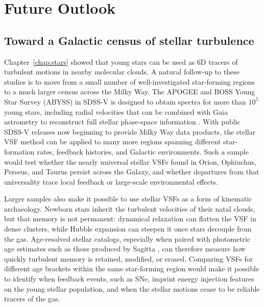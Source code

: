\section{Future Outlook}

\subsection{Toward a Galactic census of stellar turbulence}

Chapter~\ref{chap:stars} showed that young stars can be used as 6D tracers of turbulent motions in nearby molecular clouds.
A natural follow-up to these studies is to move from a small number of well-investigated star-forming regions to a much larger census across the Milky Way.
The APOGEE and BOSS Young Star Survey (ABYSS) in SDSS-V is designed to obtain spectra for more than $10^5$ young stars, including radial velocities that can be combined with Gaia astrometry to reconstruct full stellar phase-space information \citep{kounkel_abyss_2023}.
With public SDSS-V releases now beginning to provide Milky Way data products, the stellar VSF method can be applied to many more regions spanning different star-formation rates, feedback histories, and Galactic environments.
Such a sample would test whether the nearly universal stellar VSFs found in Orion, Ophiuchus, Perseus, and Taurus \citep{ha_turbulence_2022} persist across the Galaxy, and whether departures from that universality trace local feedback or large-scale environmental effects.

Larger samples also make it possible to use stellar VSFs as a form of kinematic archaeology.
Newborn stars inherit the turbulent velocities of their natal clouds, but that memory is not permanent: dynamical relaxation can flatten the VSF in dense clusters, while Hubble expansion can steepen it once stars decouple from the gas.
Age-resolved stellar catalogs, especially when paired with photometric age estimates such as those produced by Sagitta \citep{mcbride_untangling_2021}, can therefore measure how quickly turbulent memory is retained, modified, or erased.
Comparing VSFs for different age brackets within the same star-forming region would make it possible to identify when feedback events, such as SNe, imprint energy injection features on the young stellar population, and when the stellar motions cease to be reliable tracers of the gas.

